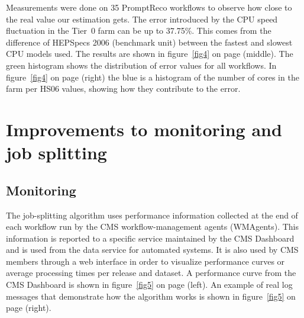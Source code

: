 \documentclass[a4paper]{jpconf}
\begin{document}
Measurements were done on 35 PromptReco workflows to observe how close to the real value our estimation gets. The error introduced by the CPU speed fluctuation in the Tier~0 farm can be up to 37.75\%. This comes from the difference of HEPSpecs 2006 (benchmark unit) between the fastest and slowest CPU models used.  The results are shown in figure~\ref{fig4} on page \pageref{fig4} (middle).  The green histogram shows the distribution of error values for all workflows. In figure~\ref{fig4} on page \pageref{fig4} (right) the blue is a histogram of the number of cores in the farm per HS06 values, showing how they contribute to the error. %


\section{Improvements to monitoring and job splitting}

\subsection{Monitoring}

The job-splitting algorithm uses performance information collected at the end of each workflow run by the CMS workflow-management agents (WMAgents).  This information is reported to a specific service maintained by the CMS Dashboard and is used from the data service for automated systems. It is also used by CMS members through a web interface in order to visualize performance curves or average processing times per release and dataset. A performance curve from the CMS Dashboard is shown in figure~\ref{fig5} on page \pageref{fig5} (left).  An example of real log messages that demonstrate how the algorithm works is shown in figure~\ref{fig5} on page \pageref{fig5} (right).
\end{document}
